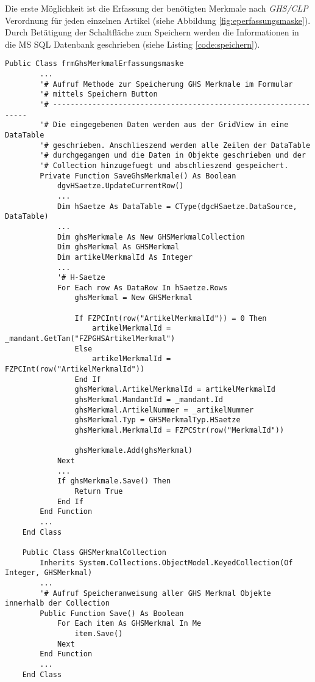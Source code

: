 \noindent
Die erste Möglichkeit ist die Erfassung der benötigten Merkmale nach \emph{GHS/CLP} Verordnung für 
jeden einzelnen Artikel (siehe Abbildung \ref{fig:eperfassungsmaske}). Durch Betätigung der Schaltfläche
zum Speichern werden die Informationen in die MS SQL Datenbank geschrieben (siehe Listing \ref{code:speichern}).
\newline
\begin{lstlisting}[style=A, caption=Auszug Speicherroutine GHS/CLP Merkmale (.NET),
label={code:speichern}]
    Public Class frmGhsMerkmalErfassungsmaske
        ...
        '# Aufruf Methode zur Speicherung GHS Merkmale im Formular 
        '# mittels Speichern Button
        '# ----------------------------------------------------------------
        '# Die eingegebenen Daten werden aus der GridView in eine DataTable 
        '# geschrieben. Anschlieszend werden alle Zeilen der DataTable 
        '# durchgegangen und die Daten in Objekte geschrieben und der 
        '# Collection hinzugefuegt und abschlieszend gespeichert.  
        Private Function SaveGhsMerkmale() As Boolean
            dgvHSaetze.UpdateCurrentRow()
            ...
            Dim hSaetze As DataTable = CType(dgcHSaetze.DataSource, DataTable)
            ...
            Dim ghsMerkmale As New GHSMerkmalCollection
            Dim ghsMerkmal As GHSMerkmal
            Dim artikelMerkmalId As Integer
            ...
            '# H-Saetze
            For Each row As DataRow In hSaetze.Rows
                ghsMerkmal = New GHSMerkmal
    
                If FZPCInt(row("ArtikelMerkmalId")) = 0 Then
                    artikelMerkmalId = _mandant.GetTan("FZPGHSArtikelMerkmal")
                Else
                    artikelMerkmalId = FZPCInt(row("ArtikelMerkmalId"))
                End If
                ghsMerkmal.ArtikelMerkmalId = artikelMerkmalId
                ghsMerkmal.MandantId = _mandant.Id
                ghsMerkmal.ArtikelNummer = _artikelNummer
                ghsMerkmal.Typ = GHSMerkmalTyp.HSaetze
                ghsMerkmal.MerkmalId = FZPCStr(row("MerkmalId"))
    
                ghsMerkmale.Add(ghsMerkmal)
            Next
            ...
            If ghsMerkmale.Save() Then
                Return True
            End If
        End Function
        ...
    End Class

    Public Class GHSMerkmalCollection
        Inherits System.Collections.ObjectModel.KeyedCollection(Of Integer, GHSMerkmal)
        ...
        '# Aufruf Speicheranweisung aller GHS Merkmal Objekte innerhalb der Collection
        Public Function Save() As Boolean
            For Each item As GHSMerkmal In Me
                item.Save()
            Next
        End Function
        ...
    End Class
    

\end{lstlisting}
